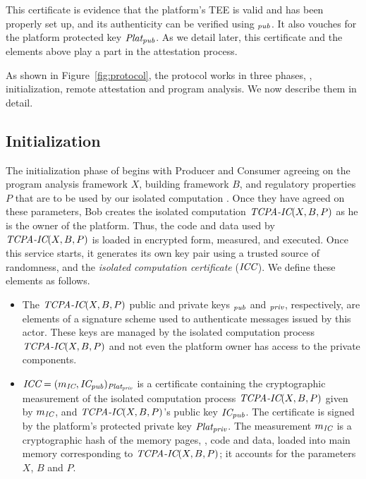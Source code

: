 This certificate is evidence that the platform's TEE is valid and has been properly set up, and its authenticity can be verified using \RoT{}$_{\textit{pub}{}}$. It also vouches for the platform protected key $\textit{Plat}_{\textit{pub}{}}$. As we detail later, this certificate and the elements above play a part in the attestation process.

As shown in Figure~\ref{fig:protocol}, the protocol works in three phases, \ie, initialization, 
remote attestation and program analysis. We now describe them in detail.

\subsection{Initialization}
\label{subsec:initialization}

The initialization phase of \tcpa begins with Producer and Consumer agreeing on the program analysis framework $X$, building framework $B$, and regulatory properties $P$ that are to be used by our isolated computation \TCPAIC{}. Once they have agreed on these parameters, Bob creates the isolated computation $\textit{TCPA-IC}{}(X,B,P)$ as he is the owner of the platform. Thus, the code and data used by $\textit{TCPA-IC}{}(X,B,P)$ is loaded in encrypted form, measured, and executed. Once this service starts, it generates its own key pair using a trusted source of randomness, and the \emph{isolated computation certificate} ($\textit{ICC}$). We define these elements as follows. 

\begin{itemize}[leftmargin=*]
	\item The $\textit{TCPA-IC}{}(X,B,P)$ public and private keys \IC{}$_{\textit{pub}{}}$ and \IC{}$_{\textit{priv}{}}$, respectively, are elements of a signature scheme used to authenticate messages issued by this actor. These keys are managed by the isolated computation process $\textit{TCPA-IC}{}(X,B,P)$ and not even the platform owner has access to the private components.
	
	\item $\textit{ICC}{} = (m_{\textit{IC}{}}, \textit{IC}{}_{\textit{pub}})_{\textit{Plat}{}_{\textit{priv}{}}}$ is a certificate containing the cryptographic measurement of the isolated computation process $\textit{TCPA-IC}{}(X,B,P)$ given by $m_{\textit{IC}{}}$, and $\textit{TCPA-IC}{}(X,B,P)$'s public key $\textit{IC}{}_{\textit{pub}{}}$. The certificate is signed by the platform's protected private key $\textit{Plat}{}_{\textit{priv}{}}$. The measurement $m_{\textit{IC}{}}$ is a cryptographic hash of the memory pages, \ie, code and data, loaded into main memory corresponding to $\textit{TCPA-IC}{}(X,B,P)$; it accounts for the parameters $X$, $B$ and $P$. 
\end{itemize} 

